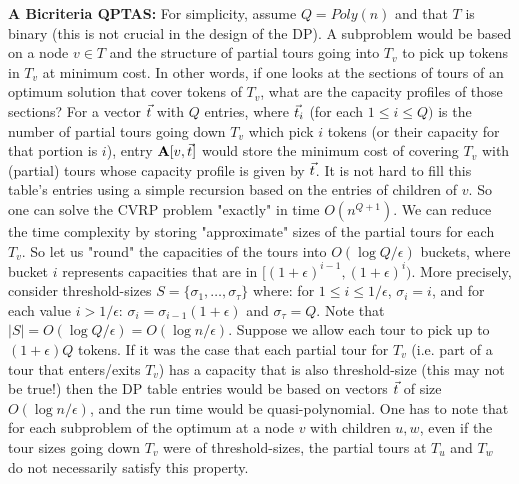 \documentclass[twoside,leqno]{article}
\newcommand{\eps}{\epsilon}
\begin{document}
{\bf A Bicriteria QPTAS:} For simplicity, assume $Q=Poly(n)$ and that $T$ is binary (this is not crucial in the design of the DP). 
A subproblem would be based on a node $v\in T$ and the structure of partial tours going into $T_v$ to pick up tokens in $T_v$
at minimum cost.
In other words, if one looks at the sections of tours of an optimum solution that cover tokens of $T_v$, what are the capacity profiles of those sections? For a vector $\vec{t}$ with $Q$ entries, where $\vec{t}_i$ (for each $1 \le i \le Q)$ is the number of partial tours going down $T_v$ which pick $i$ tokens (or their capacity for that portion is $i$), entry $\textbf{A}[v, \vec{t}]$ would store the minimum cost of covering $T_v$ with (partial) tours whose capacity profile is given by $\vec{t}$. It is not hard to fill this table's entries using a simple recursion based on the entries of children of $v$. So one can solve the CVRP problem "exactly" in time $O(n^{Q+1})$. We can reduce the time complexity by storing "approximate" sizes of the partial tours for each $T_v$.
So let us "round" the capacities of the tours into $O(\log Q/\epsilon)$  buckets, where bucket $i$ represents capacities that are in
$[(1+\eps)^{i-1},(1+\eps)^i)$. More precisely, consider threshold-sizes $S = \{\sigma_1, \ldots, \sigma_\tau \}$ where: for $1\leq i\leq 1/\epsilon$, $\sigma_i=i$, and for each value $i>1/\epsilon$: $\sigma_i = \sigma_{i-1}(1 + \eps)$ and $\sigma_\tau = Q$. Note 
that $|S|=O(\log Q/\epsilon)=O(\log n/\eps)$. Suppose we allow each tour to pick up to $(1+\epsilon)Q$
tokens. If it was the case that each partial tour for $T_v$ (i.e. part of a tour that enters/exits $T_v$) has a capacity that is also threshold-size (this may not be true!) then the DP table entries
would be based on vectors $\vec{t}$ of size $O(\log n/\epsilon)$, and the run time would be quasi-polynomial. One has to note that
for each subproblem of the optimum at a node $v$ with children $u,w$, even if the tour sizes going down $T_v$
were of threshold-sizes, the partial tours at $T_u$ and $T_w$ do not necessarily satisfy this property.
\end{document}
